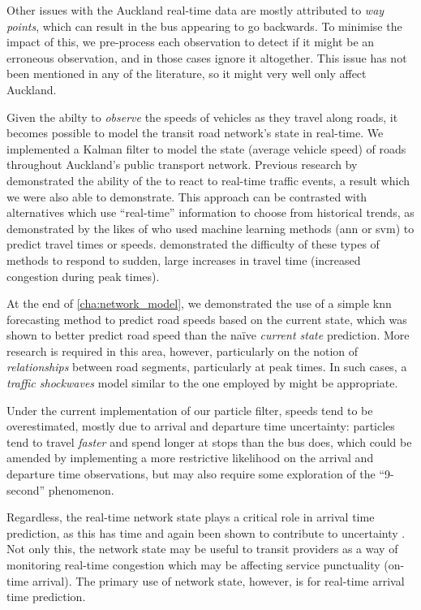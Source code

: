 Other issues with the Auckland real-time data are mostly attributed to \emph{way points}, which can result in the bus appearing to go backwards. To minimise the impact of this, we pre-process each observation to detect if it might be an erroneous observation, and in those cases ignore it altogether. This issue has not been mentioned in any of the literature, so it might very well only affect Auckland.


Given the abilty to \emph{observe} the speeds of vehicles as they travel along roads, it becomes possible to model the transit road network's state in real-time. We implemented a Kalman filter to model the state (average vehicle speed) of roads throughout Auckland's public transport network. Previous research by \citet{Shalaby_2004} demonstrated the ability of the \kf{} to react to real-time traffic events, a result which we were also able to demonstrate. This approach can be contrasted with alternatives which use ``real-time'' information to choose from historical trends, as demonstrated by the likes of \citet{Chen_2014,Julio_2016,Yu_2010,Yu_2011,Celan_2017} who used machine learning methods (\gls{ann} or \gls{svm}) to predict travel times or speeds.  demonstrated the difficulty of these types of methods to respond to sudden, large increases in travel time (increased congestion during peak times).


At the end of \cref{cha:network_model}, we demonstrated the use of a simple \gls{knn} forecasting method to predict road speeds based on the current state, which was shown to better predict road speed than the na\"ive \emph{current state} prediction. More research is required in this area, however, particularly on the notion of \emph{relationships} between road segments, particularly at peak times. In such cases, a \emph{traffic shockwaves} model similar to the one employed by \citet{Julio_2016} might be appropriate.


Under the current implementation of our particle filter, speeds tend to be overestimated, mostly due to arrival and departure time uncertainty: particles tend to travel \emph{faster} and spend longer at stops than the bus does, which could be amended by implementing a more restrictive likelihood on the arrival and departure time observations, but may also require some exploration of the ``9-second'' phenomenon.


Regardless, the real-time network state plays a critical role in arrival time prediction, as this has time and again been shown to contribute to uncertainty \citep{Shalaby_2004,Yu_2006,Yu_2010,Yu_2011,Julio_2016}. Not only this, the network state may be useful to transit providers as a way of monitoring real-time congestion which may be affecting service punctuality (on-time arrival). The primary use of network state, however, is for real-time arrival time prediction.



